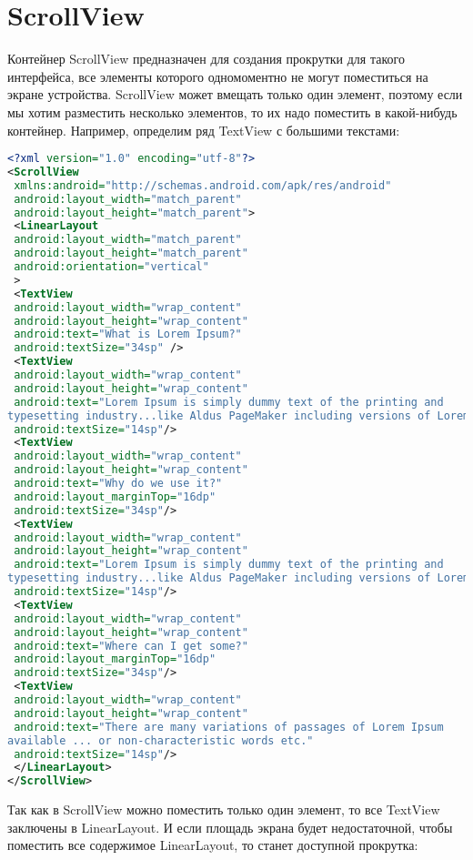\section{ScrollView}
Контейнер ScrollView предназначен для создания прокрутки для такого
интерфейса, все элементы которого одномоментно не могут поместиться на
экране устройства. ScrollView может вмещать только один элемент, поэтому
если мы хотим разместить несколько элементов, то их надо поместить в
какой-нибудь контейнер.
Например, определим ряд TextView с большими текстами:
\begin{lstlisting}[language=xml, caption=\leftline{xml}, label=lst:ScrollView]
<?xml version="1.0" encoding="utf-8"?>
<ScrollView
 xmlns:android="http://schemas.android.com/apk/res/android"
 android:layout_width="match_parent"
 android:layout_height="match_parent">
 <LinearLayout
 android:layout_width="match_parent"
 android:layout_height="match_parent"
 android:orientation="vertical"
 >
 <TextView
 android:layout_width="wrap_content"
 android:layout_height="wrap_content"
 android:text="What is Lorem Ipsum?"
 android:textSize="34sp" />
 <TextView
 android:layout_width="wrap_content"
 android:layout_height="wrap_content"
 android:text="Lorem Ipsum is simply dummy text of the printing and
typesetting industry...like Aldus PageMaker including versions of Lorem Ipsum."
 android:textSize="14sp"/>
 <TextView
 android:layout_width="wrap_content"
 android:layout_height="wrap_content"
 android:text="Why do we use it?"
 android:layout_marginTop="16dp"
 android:textSize="34sp"/>
 <TextView
 android:layout_width="wrap_content"
 android:layout_height="wrap_content"
 android:text="Lorem Ipsum is simply dummy text of the printing and
typesetting industry...like Aldus PageMaker including versions of Lorem Ipsum."
 android:textSize="14sp"/>
 <TextView
 android:layout_width="wrap_content"
 android:layout_height="wrap_content"
 android:text="Where can I get some?"
 android:layout_marginTop="16dp"
 android:textSize="34sp"/>
 <TextView
 android:layout_width="wrap_content"
 android:layout_height="wrap_content"
 android:text="There are many variations of passages of Lorem Ipsum
available ... or non-characteristic words etc."
 android:textSize="14sp"/>
 </LinearLayout>
</ScrollView>
\end{lstlisting}
Так как в ScrollView можно поместить только один элемент, то все TextView
заключены в LinearLayout. И если площадь экрана будет недостаточной,
чтобы поместить все содержимое LinearLayout, то станет доступной
прокрутка:
